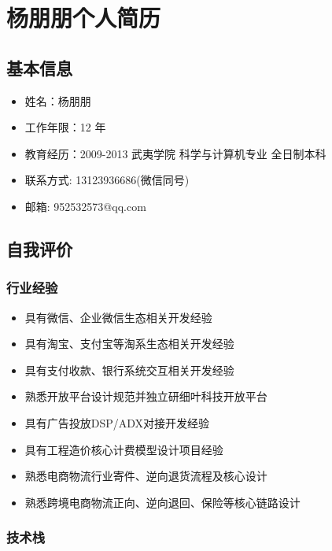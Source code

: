 \section{杨朋朋个人简历}\label{ux6768ux670bux670bux4e2aux4ebaux7b80ux5386}

\subsection{基本信息}\label{ux57faux672cux4fe1ux606f}

\begin{itemize}
\tightlist
\item
  姓名：杨朋朋
\item
  工作年限：12 年
\item
  教育经历：2009-2013 \textbar{} 武夷学院 \textbar{} 科学与计算机专业
  \textbar{} 全日制本科
\item
  联系方式: 13123936686(微信同号)
\item
  邮箱: 952532573@qq.com
\end{itemize}

\subsection{自我评价}\label{ux81eaux6211ux8bc4ux4ef7}

\subsubsection{行业经验}\label{ux884cux4e1aux7ecfux9a8c}

\begin{itemize}
\tightlist
\item
  具有微信、企业微信生态相关开发经验
\item
  具有淘宝、支付宝等淘系生态相关开发经验
\item
  具有支付收款、银行系统交互相关开发经验
\item
  熟悉开放平台设计规范并独立研细叶科技开放平台
\item
  具有广告投放DSP/ADX对接开发经验
\item
  具有工程造价核心计费模型设计项目经验
\item
  熟悉电商物流行业寄件、逆向退货流程及核心设计
\item
  熟悉跨境电商物流正向、逆向退回、保险等核心链路设计
\end{itemize}

\subsubsection{技术栈}\label{ux6280ux672fux6808}

